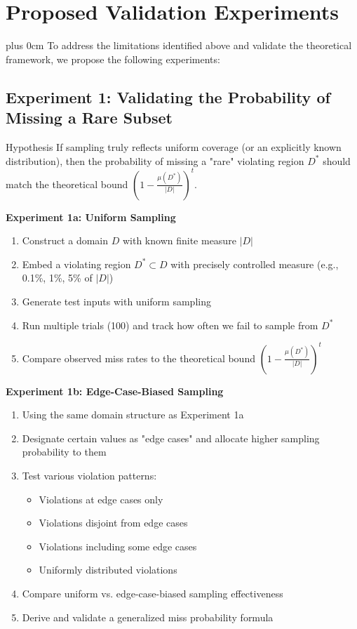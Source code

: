 \documentclass[11pt,a4paper]{article}
\newcommand{\justifytext}{\leftskip=0pt \rightskip=0pt plus 0cm}
\begin{document}
\section{Proposed Validation Experiments}

\justifytext
To address the limitations identified above and validate the theoretical framework, we propose the following experiments:

\subsection{Experiment 1: Validating the Probability of Missing a Rare Subset}

\begin{theorembox}{Hypothesis}
If sampling truly reflects uniform coverage (or an explicitly known distribution), then the probability of missing a "rare" violating region $D^*$ should match the theoretical bound $\left(1 - \frac{\mu(D^*)}{|D|}\right)^t$.
\end{theorembox}

\begin{tcolorbox}[
  colback=blue!5!white,
  colframe=blue!75!black,
  title=Experimental Design,
  fonttitle=\bfseries
]

\textbf{Experiment 1a: Uniform Sampling}
\begin{enumerate}
\item Construct a domain $D$ with known finite measure $|D|$
\item Embed a violating region $D^* \subset D$ with precisely controlled measure (e.g., 0.1\%, 1\%, 5\% of $|D|$)
\item Generate test inputs with uniform sampling
\item Run multiple trials (100) and track how often we fail to sample from $D^*$
\item Compare observed miss rates to the theoretical bound $\left(1 - \frac{\mu(D^*)}{|D|}\right)^t$
\end{enumerate}

\textbf{Experiment 1b: Edge-Case-Biased Sampling}
\begin{enumerate}
\item Using the same domain structure as Experiment 1a
\item Designate certain values as "edge cases" and allocate higher sampling probability to them
\item Test various violation patterns:
   \begin{itemize}
   \item Violations at edge cases only
   \item Violations disjoint from edge cases
   \item Violations including some edge cases
   \item Uniformly distributed violations
   \end{itemize}
\item Compare uniform vs. edge-case-biased sampling effectiveness
\item Derive and validate a generalized miss probability formula
\end{enumerate}
\end{tcolorbox}
\end{document}

